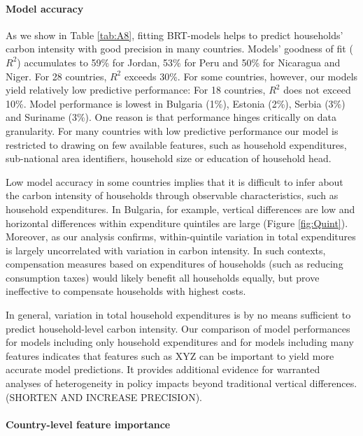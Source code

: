 \documentclass[12pt, a4paper]{article}
\begin{document}
\paragraph{Model accuracy} As we show in Table \ref{tab:A8}, fitting BRT-models helps to predict households' carbon intensity with good precision in many countries. Models' goodness of fit ($R^{2}$) accumulates to 59\% for Jordan, 53\% for Peru and 50\% for Nicaragua and Niger. For 28 countries, $R^{2}$ exceeds 30\%. For some countries, however, our models yield relatively low predictive performance: For 18 countries, $R^{2}$ does not exceed 10\%. Model performance is lowest in Bulgaria (1\%), Estonia (2\%), Serbia (3\%) and Suriname (3\%). One reason is that performance hinges critically on data granularity. For many countries with low predictive performance our model is restricted to drawing on few available features, such as household expenditures, sub-national area identifiers, household size or education of household head.

Low model accuracy in some countries implies that it is difficult to infer about the carbon intensity of households through observable characteristics, such as household expenditures. In Bulgaria, for example, vertical differences are low and horizontal differences within expenditure quintiles are large (Figure \ref{fig:Quint}). Moreover, as our analysis confirms, within-quintile variation in total expenditures is largely uncorrelated with variation in carbon intensity. In such contexts, compensation measures based on expenditures of households (such as reducing consumption taxes) would likely benefit all households equally, but prove ineffective to compensate households with highest costs.

In general, variation in total household expenditures is by no means sufficient to predict household-level carbon intensity. Our comparison of model performances for models including only household expenditures and for models including many features indicates that features such as XYZ can be important to yield more accurate model predictions. It provides additional evidence for warranted analyses of heterogeneity in policy impacts beyond traditional vertical differences. (SHORTEN AND INCREASE PRECISION).

\paragraph{Country-level feature importance}
\end{document}

